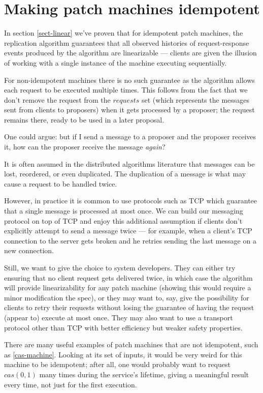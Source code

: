 \documentclass[12pt,a4paper,en]{pracamgr}
\newcommand{\ti}[1]{\textit{#1}}
\begin{document}
\section{Making patch machines idempotent}\label{sect-idemp}

In section \ref{sect-linear} we've proven that for idempotent patch machines, the replication algorithm guarantees that all observed histories of request-response events produced by the algorithm are linearizable --- clients are given the illusion of working with a single instance of the machine executing sequentially.

For non-idempotent machines there is no such guarantee as the algorithm allows each request to be executed multiple times. This follows from the fact that we don't remove the request from the $requests$ set (which represents the messages sent from clients to proposers) when it gets processed by a proposer; the request remains there, ready to be used in a later proposal.

One could argue: but if I send a message to a proposer and the proposer receives it, how can the proposer receive the message \ti{again}?

It is often assumed in the distributed algorithms literature that messages can be lost, reordered, or even duplicated. The duplication of a message is what may cause a request to be handled twice.

However, in practice it is common to use protocols such as TCP \cite{tcp} which guarantee that a single message is processed at most once. We can build our messaging protocol on top of TCP and enjoy this additional assumption if clients don't explicitly attempt to send a message twice --- for example, when a client's TCP connection to the server gets broken and he retries sending the last message on a new connection.

Still, we want to give the choice to system developers. They can either try ensuring that no client request gets delivered twice, in which case the algorithm will provide linearizability for any patch machine (showing this would require a minor modification the spec), or they may want to, say, give the possibility for clients to retry their requests without losing the guarantee of having the request (appear to) execute at most once. They may also want to use a transport protocol other than TCP with better efficiency but weaker safety properties.

There are many useful examples of patch machines that are not idempotent, such as \ref{cas-machine}. Looking at its set of inputs, it would be very weird for this machine to be idempotent; after all, one would probably want to request $cas(0, 1)$ many times during the service's lifetime, giving a meaningful result every time, not just for the first execution.
\end{document}
